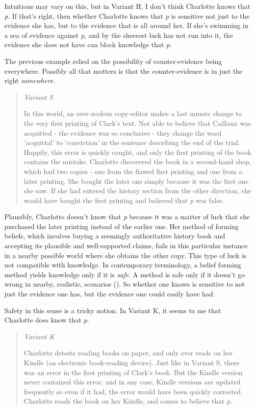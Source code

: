 \documentclass[
  10pt,
  letterpaper,
  twoside]{scrbook}
\begin{document}
Intuitions may vary on this, but in Variant H, I don't think Charlotte
knows that \emph{p}. If that's right, then whether Charlotte knows that
\emph{p} is sensitive not just to the evidence she has, but to the
evidence that is all around her. If she's swimming in a sea of evidence
against \emph{p}, and by the sheerest luck has not run into it, the
evidence she does not have can block knowledge that \emph{p}.

The previous example relied on the possibility of counter-evidence being
everywhere. Possibly all that matters is that the counter-evidence is in
just the right \emph{somewhere}.

\begin{quote}
\emph{Variant S}

In this world, an over-zealous copy-editor makes a last minute change to
the very first printing of Clark's text. Not able to believe that
Caillaux was acquitted - the evidence was so conclusive - they change
the word `acquittal' to `conviction' in the sentence describing the end
of the trial. Happily, this error is quickly caught, and only the first
printing of the book contains the mistake. Charlotte discovered the book
in a second-hand shop, which had two copies - one from the flawed first
printing and one from a later printing. She bought the later one simply
because it was the first one she saw. If she had entered the history
section from the other direction, she would have bought the first
printing and believed that \emph{p} was false.
\end{quote}

Plausibly, Charlotte doesn't know that \emph{p} because it was a matter
of luck that she purchased the later printing instead of the earlier
one. Her method of forming beliefs, which involves buying a seemingly
authoritative history book and accepting its plausible and
well-supported claims, fails in this particular instance in a nearby
possible world where she obtains the other copy. This type of luck is
not compatible with knowledge. In contemporary terminology, a belief
forming method yields knowledge only if it is \emph{safe}. A method is
safe only if it doesn't go wrong in nearby, realistic, scenarios
(). So whether one knows
is sensitive to not just the evidence one has, but the evidence one
could easily have had.

Safety in this sense is a tricky notion. In Variant K, it seems to me
that Charlotte does know that \emph{p}.

\begin{quote}
\emph{Variant K}

Charlotte detests reading books on paper, and only ever reads on her
Kindle (an electronic book-reading device). Just like in Variant S,
there was an error in the first printing of Clark's book. But the Kindle
version never contained this error, and in any case, Kindle versions are
updated frequently so even if it had, the error would have been quickly
corrected. Charlotte reads the book on her Kindle, and comes to believe
that \emph{p}.
\end{quote}
\end{document}
